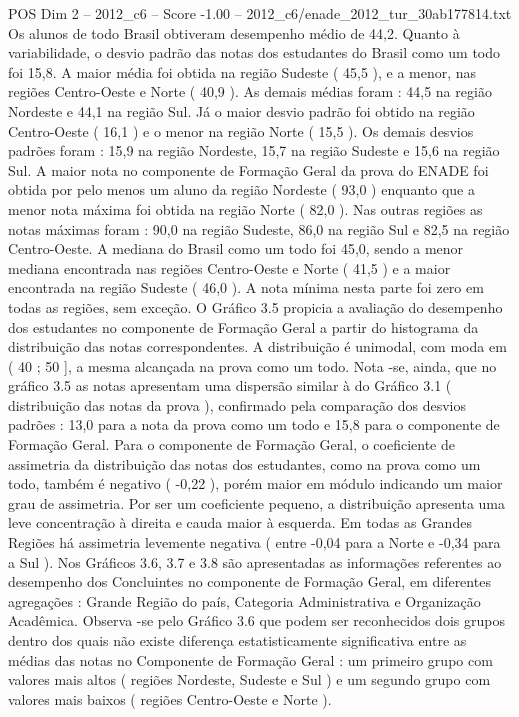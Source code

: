 \begin{textsample}{POS Dim 2 – 2012\_c6 – Score -1.00 – 2012\_c6/enade\_2012\_tur\_30ab177814.txt}
Os alunos de todo Brasil obtiveram desempenho médio de 44,2.
Quanto à variabilidade, o desvio padrão das notas dos estudantes do Brasil como um todo foi 15,8.
A maior média foi obtida na região Sudeste ( 45,5 ), e a menor, nas regiões Centro-Oeste e Norte ( 40,9 ).
As demais médias foram : 44,5 na região Nordeste e 44,1 na região Sul.
Já o maior desvio padrão foi obtido na região Centro-Oeste ( 16,1 ) e o menor na região Norte ( 15,5 ).
Os demais desvios padrões foram : 15,9 na região Nordeste, 15,7 na região Sudeste e 15,6 na região Sul.
A maior nota no componente de Formação Geral da prova do ENADE foi obtida por pelo menos um aluno da região Nordeste ( 93,0 ) enquanto que a menor nota máxima foi obtida na região Norte ( 82,0 ).
Nas outras regiões as notas máximas foram : 90,0 na região Sudeste, 86,0 na região Sul e 82,5 na região Centro-Oeste.
A mediana do Brasil como um todo foi 45,0, sendo a menor mediana encontrada nas regiões Centro-Oeste e Norte ( 41,5 ) e a maior encontrada na região Sudeste ( 46,0 ).
A nota mínima nesta parte foi zero em todas as regiões, sem exceção.
O Gráfico 3.5 propicia a avaliação do desempenho dos estudantes no componente de Formação Geral a partir do histograma da distribuição das notas correspondentes.
A distribuição é unimodal, com moda em ( 40 ; 50 ], a mesma alcançada na prova como um todo.
Nota -se, ainda, que no gráfico 3.5 as notas apresentam uma dispersão similar à do Gráfico 3.1 ( distribuição das notas da prova ), confirmado pela comparação dos desvios padrões : 13,0 para a nota da prova como um todo e 15,8 para o componente de Formação Geral.
Para o componente de Formação Geral, o coeficiente de assimetria da distribuição das notas dos estudantes, como na prova como um todo, também é negativo ( -0,22 ), porém maior em módulo indicando um maior grau de assimetria.
Por ser um coeficiente pequeno, a distribuição apresenta uma leve concentração à direita e cauda maior à esquerda.
Em todas as Grandes Regiões há assimetria levemente negativa ( entre -0,04 para a Norte e -0,34 para a Sul ).
Nos Gráficos 3.6, 3.7 e 3.8 são apresentadas as informações referentes ao desempenho dos Concluintes no componente de Formação Geral, em diferentes agregações : Grande Região do país, Categoria Administrativa e Organização Acadêmica.
Observa -se pelo Gráfico 3.6 que podem ser reconhecidos dois grupos dentro dos quais não existe diferença estatisticamente significativa entre as médias das notas no Componente de Formação Geral : um primeiro grupo com valores mais altos ( regiões Nordeste, Sudeste e Sul ) e um segundo grupo com valores mais baixos ( regiões Centro-Oeste e Norte ).

\end{textsample}
